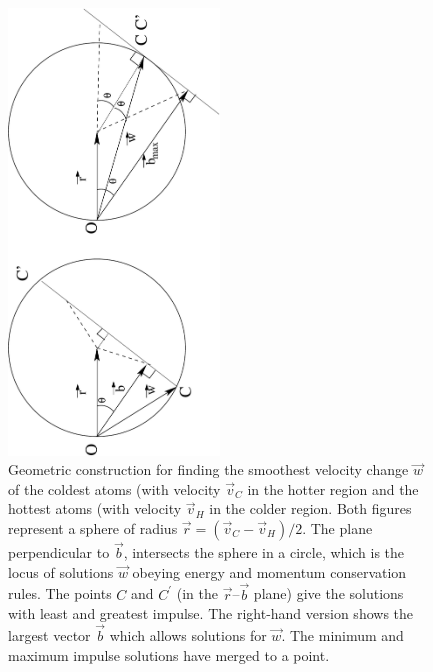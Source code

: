\documentclass[aps,prb,twocolumn,showpacs,superscriptaddress]{revtex4-1}\begin{tiny}\end{tiny}
\begin{document}
\par
\begin{figure}[top]
\includegraphics[angle=270,width=0.5\textwidth]{spheres.pdf}
\caption{\label{fig:spheres} Geometric construction for finding the smoothest velocity change $\vec{w}$
of the coldest atoms (with velocity $\vec{v}_C$  in the hotter region and the hottest atoms
(with velocity $\vec{v}_H$ in the colder region.  Both figures
represent a sphere of radius $\vec{r}=(\vec{v}_C -\vec{v}_H)/2$.  The plane perpendicular to {$\vec{b}$},
intersects the sphere in a circle, which is the locus of solutions $\vec{w}$ obeying energy and momentum
conservation rules.  The points $C$ and $C^\prime$ (in the $\vec{r}$--$\vec{b}$ plane) give the
solutions with least and greatest impulse.  The right-hand version shows the largest vector $\vec{b}$
which allows solutions for $\vec{w}$.  The minimum and maximum impulse solutions have
merged to a point.}
\end{figure}
\par
\end{document}

